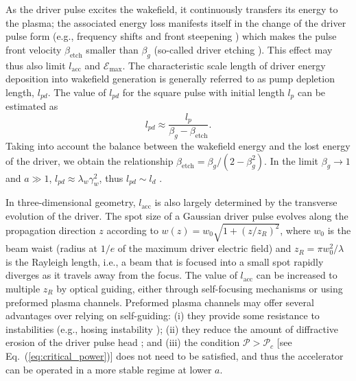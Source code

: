 \documentclass[10pt, a4paper, twoside, openright]{report}
\begin{document}
As the driver pulse excites the wakefield, it continuously transfers its energy to the plasma; the associated energy loss manifests itself in the change of the driver pulse form (e.g., frequency shifts \cite{Esarey1990, Shadwick2009} and front steepening \cite{Bulanov1992, Esarey2000, Gordon2003}) which makes the pulse front velocity $ \beta_{\mathrm{etch}} $ smaller than $ \beta_g $ (so-called driver etching \cite{Nakajima2011}). This effect may thus also limit $ l_{\mathrm{acc}} $ and $ \mathcal{E}_{\mathrm{max}} $. The characteristic scale length of driver energy deposition into wakefield generation is generally referred to as pump depletion length, $ l_{pd} $. The value of $ l_{pd} $ for the square pulse with initial length $ l_p $ can be estimated as \cite{Bulanov2016}
\begin{equation}\label{key}
	l_{pd} \approx \frac{l_p}{\beta_g - \beta_{\mathrm{etch}}}.
\end{equation}
Taking into account the balance between the wakefield energy and the lost energy of the driver, we obtain the relationship $ \beta_{\mathrm{etch}} = \beta_g / \left( 2 - \beta_g^2 \right) $. In the limit $ \beta_g \rightarrow 1 $ and $ a \gg 1 $, $ l_{pd} \approx \lambda_w \gamma_w^2 $, thus $ l_{pd} \sim l_d $ \cite{Bulanov2016}.

In three-dimensional geometry, $ l_{\mathrm{acc}} $ is also largely determined by the transverse evolution of the driver. The spot size of a Gaussian driver pulse evolves along the propagation direction $ z $ according to $ w \left( z \right) = w_0 \sqrt{1 + \left( z / z_R \right)^2} $, where $ w_0 $ is the beam waist (radius at $ 1 / e $ of the maximum driver electric field) and $ z_R = \pi w_0^2 / \lambda $ is the Rayleigh length, i.e., a beam that is focused into a small spot rapidly diverges as it travels away from the focus. The value of $ l_{\mathrm{acc}} $ can be increased to multiple $ z_{R} $ by optical guiding, either through self-focusing mechanisms or using preformed plasma channels. Preformed plasma channels may offer several advantages over relying on self-guiding: (i) they provide some resistance to instabilities (e.g., hosing instability \cite{Shvets1994, Sprangle1994}); (ii) they reduce the amount of diffractive erosion of the driver pulse head \cite{Sprangle1990, Esarey1997}; and (iii) the condition $ \mathcal{P} > \mathcal{P}_c $ [see Eq.~(\ref{eq:critical_power})] does not need to be satisfied, and thus the accelerator can be operated in a more stable regime at lower $ a $.
\end{document}

